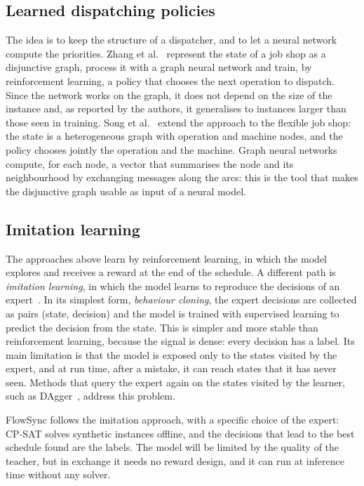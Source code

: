 \subsection{Learned dispatching policies}

The idea is to keep the structure of a dispatcher, and to let a neural network compute the
priorities. Zhang et al.~\cite{zhang2020l2d} represent the state of a job shop as a disjunctive
graph, process it with a graph neural network and train, by reinforcement learning, a policy that
chooses the next operation to dispatch. Since the network works on the graph, it does not depend on
the size of the instance and, as reported by the authors, it generalises to instances larger than
those seen in training. Song et al.~\cite{song2023fjsp} extend the approach to the flexible job
shop: the state is a heterogeneous graph with operation and machine nodes, and the policy
chooses jointly the operation and the machine. Graph neural networks~\cite{scarselli2009}
compute, for each node, a vector that summarises the node and its neighbourhood by exchanging
messages along the arcs: this is the tool that makes the disjunctive graph usable as input of a
neural model.

\subsection{Imitation learning}

The approaches above learn by reinforcement learning, in which the model explores and receives a
reward at the end of the schedule. A different path is \emph{imitation learning}, in which the
model learns to reproduce the decisions of an expert~\cite{hussein2017imitation}. In its simplest
form, \emph{behaviour cloning}, the expert decisions are collected as pairs (state, decision) and
the model is trained with supervised learning to predict the decision from the state. This is
simpler and more stable than reinforcement learning, because the signal is dense: every decision
has a label. Its main limitation is that the model is exposed only to the states visited by the
expert, and at run time, after a mistake, it can reach states that it has never seen. Methods that
query the expert again on the states visited by the learner, such as DAgger~\cite{ross2011dagger},
address this problem.

FlowSync follows the imitation approach, with a specific choice of the expert: CP-SAT solves
synthetic instances offline, and the decisions that lead to the best schedule found are the
labels. The model will be limited by the quality of the teacher, but in exchange it needs no
reward design, and it can run at inference time without any solver.

